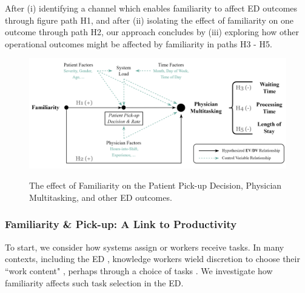  After (i) identifying a channel which enables familiarity to affect ED outcomes through figure path H1, and after (ii) isolating the effect of familiarity on one outcome through path H2, our approach concludes by (iii) exploring how other operational outcomes might be affected by familiarity in paths H3 - H5.
 
 \begin{figure}[htbp]
     \centering
     \caption{The effect of Familiarity on the Patient Pick-up Decision, Physician Multitasking, and other ED outcomes.} \medskip
     \includegraphics[scale=.8]{Figures/PU/Path Diagram.png}     
     \label{fig:path}
 \end{figure}
 
 \subsubsection{Familiarity \& Pick-up: A Link to Productivity}
 To start, we consider how systems assign or workers receive tasks. In many contexts, including the ED \citep[see][]{Chan2016}, knowledge workers wield discretion to choose their “work content" \citep[p. 340]{Allon2019}, perhaps through a choice of tasks \citep[e.g.,][]{VanDonselaar2010,KC2020_productivity,Ibanez2017}. We investigate how familiarity affects such task selection in the ED. 
 
